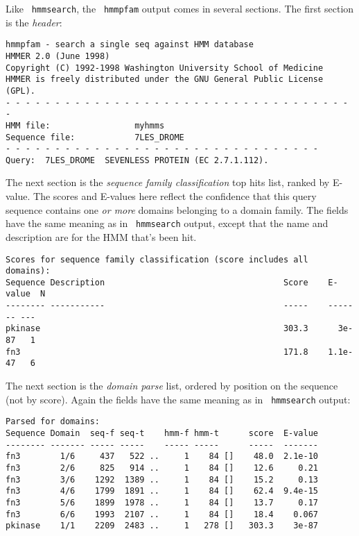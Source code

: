 \documentclass[11pt]{report}
\newcommand{\prog}[1]{\texttt{#1}}
\begin{document}
Like \prog{ hmmsearch}, the \prog{ hmmpfam} output comes in several
sections. The first section is the {\em header}:

{\small\begin{verbatim}
hmmpfam - search a single seq against HMM database
HMMER 2.0 (June 1998)
Copyright (C) 1992-1998 Washington University School of Medicine
HMMER is freely distributed under the GNU General Public License (GPL).
- - - - - - - - - - - - - - - - - - - - - - - - - - - - - - - - - - - -
HMM file:                 myhmms
Sequence file:            7LES_DROME
- - - - - - - - - - - - - - - - - - - - - - - - - - - - - - - -
Query:  7LES_DROME  SEVENLESS PROTEIN (EC 2.7.1.112).
\end{verbatim}}

The next section is the {\em sequence family classification} top hits
list, ranked by E-value. The scores and E-values here reflect the
confidence that this query sequence contains one {\em or more} domains
belonging to a domain family. The fields have the same meaning as in
\prog{ hmmsearch} output, except that the name and description are for
the HMM that's been hit.

{\small\begin{verbatim}
Scores for sequence family classification (score includes all domains):
Sequence Description                                    Score    E-value  N 
-------- -----------                                    -----    ------- ---
pkinase                                                 303.3      3e-87   1
fn3                                                     171.8    1.1e-47   6
\end{verbatim}}

The next section is the {\em domain parse} list, ordered by position
on the sequence (not by score). Again the fields have the same meaning
as in \prog{ hmmsearch} output:

{\small\begin{verbatim}
Parsed for domains:
Sequence Domain  seq-f seq-t    hmm-f hmm-t      score  E-value
-------- ------- ----- -----    ----- -----      -----  -------
fn3        1/6     437   522 ..     1    84 []    48.0  2.1e-10
fn3        2/6     825   914 ..     1    84 []    12.6     0.21
fn3        3/6    1292  1389 ..     1    84 []    15.2     0.13
fn3        4/6    1799  1891 ..     1    84 []    62.4  9.4e-15
fn3        5/6    1899  1978 ..     1    84 []    13.7     0.17
fn3        6/6    1993  2107 ..     1    84 []    18.4    0.067
pkinase    1/1    2209  2483 ..     1   278 []   303.3    3e-87
\end{verbatim}}
\end{document}
